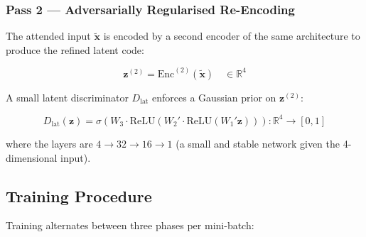 \documentclass[12pt,a4paper]{article}
\begin{document}
\subsubsection{Pass 2 --- Adversarially Regularised Re-Encoding}

The attended input $\tilde{\mathbf{x}}$ is encoded by a second encoder
of the same architecture to produce the refined latent code:

\begin{equation}
\mathbf{z}^{(2)} = \text{Enc}^{(2)}(\tilde{\mathbf{x}})
    \quad \in \mathbb{R}^{4}
\label{eq:enc2}
\end{equation}

\noindent
A small latent discriminator $D_\text{lat}$ enforces a Gaussian prior on
$\mathbf{z}^{(2)}$:

\begin{equation}
D_\text{lat}(\mathbf{z}) = \sigma(W_3 \cdot \text{ReLU}(W_2' \cdot \text{ReLU}(W_1' \mathbf{z})))
    : \mathbb{R}^4 \to [0,1]
\label{eq:dlat}
\end{equation}

\noindent
where the layers are $4 \to 32 \to 16 \to 1$ (a small and stable network
given the 4-dimensional input).

\subsection{Training Procedure}

Training alternates between three phases per mini-batch:
\end{document}
